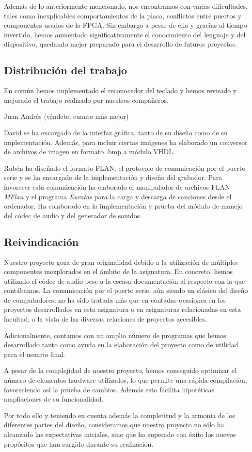 \documentclass{article}
\begin{document}
Además de lo anteriormente mencionado, nos encontramos con varias dificultades, tales como inexplicables comportamientos de la placa, conflictos entre puertos y componentes usados de la FPGA.
Sin embargo a pesar de ello y gracias al tiempo invertido, hemos aumentado significativamente el conocimiento del lenguaje y del dispositivo, quedando mejor preparado para el desarrollo de futuros proyectos.

\subsection{Distribución del trabajo}
	En común hemos implementado el reconocedor del teclado y hemos revisado y mejorado el trabajo realizado por nuestros compañeros.

	\medskip Juan Andrés (véndete, cuanto más mejor)

	\medskip David se ha encargado de la interfaz gráfica, tanto de su diseño como de su implementación. Además, para incluir ciertas imágenes ha elaborado un conversor de archivos de imagen en formato .bmp a módulo VHDL.

	\medskip Rubén ha diseñado el formato FLAN, el protocolo de comunicación por el puerto serie y se ha encargado de la implementación y diseño del grabador. Para favorecer esta comunicación ha elaborado el manipulador de archivos FLAN {\itshape MFlan} y el programa {\itshape Eurotas} para la carga y descarga de canciones desde el ordenador. Ha colaborado en la implementación y prueba del módulo de manejo del códec de audio y del generador de sonidos.

\subsection{Reivindicación}
	Nuestro proyecto goza de gran originalidad debido a la utilización de múltiples componentes inexplorados en el ámbito de la asignatura. En concreto, hemos utilizado el códec de audio pese a la escasa documentación al respecto con la que contábamos. La comunicación por el puerto serie, aún siendo un clásico del diseño de computadores, no ha sido tratada más que en contadas ocasiones en los proyectos desarrollados en esta asignatura o en asignaturas relacionadas en esta facultad, a la vista de las diversas relaciones de proyectos accesibles.

	Adicionalmente, contamos con un amplio número de programas que hemos desarrollado tanto como ayuda en la elaboración del proyecto como de utilidad para el usuario final.

	A pesar de la complejidad de nuestro proyecto, hemos conseguido optimizar el número de elementos hardware utilizados, lo que permite una rápida compilación, favoreciendo así la prueba de cambios. Además esto facilita hipotéticas ampliaciones de su funcionalidad.

	\medskip Por todo ello y teniendo en cuenta además la completitud y la armonía de los diferentes partes del diseño, consideramos que nuestro proyecto no sólo ha alcanzado las expectativas iniciales, sino que ha superado con éxito los nuevos propósitos que han surgido durante su realización.

\newpage
{} {}


\end{document}

